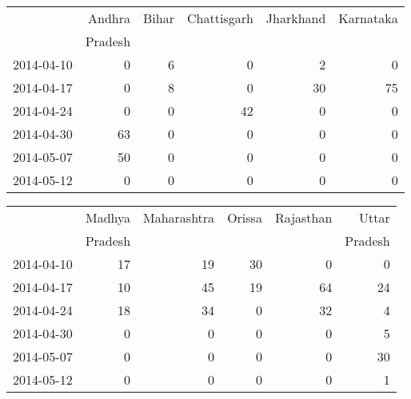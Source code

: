 \begin{tabular}{rrrrrr}
  \hline
 & Andhra  & Bihar & Chattisgarh & Jharkhand & Karnataka  \\ 
 &  Pradesh &  &  &  &  \\ 
  \hline
2014-04-10 &   0 &   6 &   0 &   2 &   0 &  \\ 
  2014-04-17 &   0 &   8 &   0 &  30 &  75 & \\ 
  2014-04-24 &   0 &   0 &  42 &   0 &   0 &  \\ 
  2014-04-30 &  63 &   0 &   0 &   0 &   0 &  \\ 
  2014-05-07 &  50 &   0 &   0 &   0 &   0 &  \\ 
  2014-05-12 &   0 &   0 &   0 &   0 &   0 &  \\ 
   \hline
\end{tabular}
\medskip
\begin{tabular}{rrrrrr}
  \hline
 & Madhya  & Maharashtra & Orissa & Rajasthan & Uttar  \\ 
 &  Pradesh &  &  &  &  Pradesh \\ 
  \hline
2014-04-10 &  17 &  19 &  30 &   0 &   0 \\ 
  2014-04-17 &   10 &  45 &  19 &  64 &  24 \\ 
  2014-04-24 &   18 &  34 &   0 &  32 &   4 \\ 
  2014-04-30 &    0 &   0 &   0 &   0 &   5 \\ 
  2014-05-07 &    0 &   0 &   0 &   0 &  30 \\ 
  2014-05-12 &   0 &   0 &   0 &   0 &   1 \\ 
   \hline
\end{tabular}

